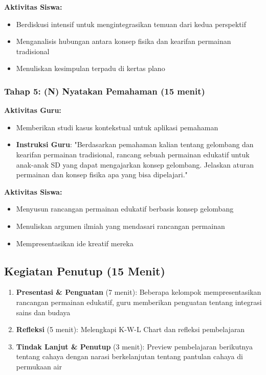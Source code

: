 \documentclass[12pt,a4paper]{article}
\begin{document}
\textbf{Aktivitas Siswa:}
\begin{itemize}
\item Berdiskusi intensif untuk mengintegrasikan temuan dari kedua perspektif
\item Menganalisis hubungan antara konsep fisika dan kearifan permainan tradisional
\item Menuliskan kesimpulan terpadu di kertas plano
\end{itemize}

\subsubsection{Tahap 5: (N) Nyatakan Pemahaman (15 menit)}

\textbf{Aktivitas Guru:}
\begin{itemize}
\item Memberikan studi kasus kontekstual untuk aplikasi pemahaman
\item \textbf{Instruksi Guru}: "Berdasarkan pemahaman kalian tentang gelombang dan kearifan permainan tradisional, rancang sebuah permainan edukatif untuk anak-anak SD yang dapat mengajarkan konsep gelombang. Jelaskan aturan permainan dan konsep fisika apa yang bisa dipelajari."
\end{itemize}

\textbf{Aktivitas Siswa:}
\begin{itemize}
\item Menyusun rancangan permainan edukatif berbasis konsep gelombang
\item Menuliskan argumen ilmiah yang mendasari rancangan permainan
\item Mempresentasikan ide kreatif mereka
\end{itemize}

\subsection{Kegiatan Penutup (15 Menit)}

\begin{enumerate}
\item \textbf{Presentasi \& Penguatan} (7 menit): Beberapa kelompok mempresentasikan rancangan permainan edukatif, guru memberikan penguatan tentang integrasi sains dan budaya
\item \textbf{Refleksi} (5 menit): Melengkapi K-W-L Chart dan refleksi pembelajaran
\item \textbf{Tindak Lanjut \& Penutup} (3 menit): Preview pembelajaran berikutnya tentang cahaya dengan narasi berkelanjutan tentang pantulan cahaya di permukaan air
\end{enumerate}
\end{document}
